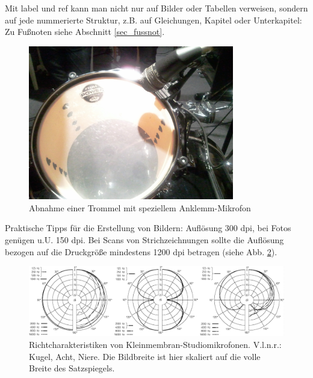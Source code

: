 Mit label und ref kann man nicht nur auf Bilder oder Tabellen verweisen, sondern auf jede nummerierte Struktur, z.B. auf Gleichungen, Kapitel oder Unterkapitel: Zu Fußnoten siehe Abschnitt \ref{sec_fussnot}.

\begin{figure}[htp]     %
\centering
\includegraphics[width=0.8\textwidth]{bilder/drums}
\caption{Abnahme einer Trommel mit speziellem Anklemm-Mikrofon}\label{b_trommelmik}
\end{figure}

Praktische Tipps für die Erstellung von Bildern: Auflösung 300 dpi, bei Fotos genügen u.U. 150 dpi. Bei Scans von Strichzeichnungen sollte die Auflösung bezogen auf die Druckgröße mindestens 1200 dpi betragen (siehe Abb. \ref{b_richtch}).

\begin{figure}[htp]     %
\centering
\includegraphics[width=1.0\textwidth]{bilder/3x_richtchars}
\caption[Richtcharakteristiken von Kleinmembran-Studiomikrofonen]{Richtcharakteristiken von Kleinmembran-Studiomikrofonen. V.l.n.r.: Kugel, Acht, Niere. Die Bildbreite ist hier skaliert auf die volle Breite des Satzspiegels.}\label{b_richtch}
\end{figure}

